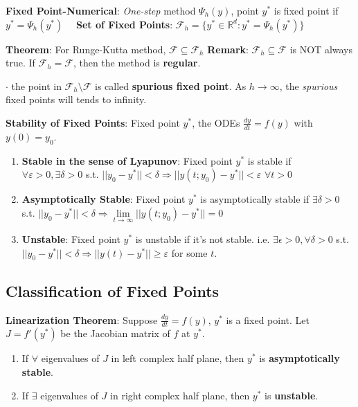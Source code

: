 \documentclass[9pt]{article}
\begin{document}
\textbf{Fixed Point-Numerical}: \textit{One-step} method $\Psi_h(y)$, point $y^*$ is fixed point if $y^*=\Psi_h(y^*)$ {\footnotesize \ \ \textbf{Set of Fixed Points}: $\mathcal{F}_h=\{y^*\in\mathbb{R}^d:y^*=\Psi_h(y^*)\}$}

\textbf{Theorem}: For Runge-Kutta method, $\mathcal{F}\subseteq\mathcal{F}_h$ \qquad \qquad \textbf{Remark}: {\small $\mathcal{F}_h\subseteq\mathcal{F}$ is NOT always true. \qquad If $\mathcal{F}_h=\mathcal{F}$, then the method is \textbf{regular}.}

$\cdot$ the point in $\mathcal{F}_h\setminus\mathcal{F}$ is called \textbf{spurious fixed point}. \qquad \qquad As $h\to\infty$, the \textit{spurious} fixed points will tends to infinity.

\textbf{Stability of Fixed Points}: Fixed point $y^*$, the ODEs $\frac{dy}{dt}=f(y)$ with $y(0)=y_0$.
\begin{enumerate}[itemsep=-2pt, topsep=-2pt]
    \item \textbf{Stable in the sense of Lyapunov}: Fixed point $y^*$ is stable if $\forall \varepsilon>0,\exists \delta>0$ s.t. $||y_0-y^*||<\delta\Rightarrow||y(t;y_0)-y^*||<\varepsilon$ $\forall t>0$
    \item \textbf{Asymptotically Stable}: Fixed point $y^*$ is asymptotically stable if $\exists \delta>0$ s.t. $||y_0-y^*||<\delta\Rightarrow\lim\limits_{t\to\infty}||y(t;y_0)-y^*||=0$
    \item \textbf{Unstable}: Fixed point $y^*$ is unstable if it's not stable. \quad i.e. $\exists \epsilon>0,\forall \delta>0$ s.t. $||y_0-y^*||<\delta\Rightarrow||y(t)-y^*||\geq\varepsilon$ for some $t$.
\end{enumerate}


\subsection{Classification of Fixed Points} %

\textbf{Linearization Theorem}: Suppose $\frac{dy}{dt}=f(y)$, $y^*$ is a fixed point. Let $J=f'(y^*)$ be the Jacobian matrix of $f$ at $y^*$.

\begin{enumerate}[itemsep=-2pt, topsep=-2pt]
    \item If $\forall$ eigenvalues of $J$ in left complex half plane, then $y^*$ is \textbf{asymptotically stable}.
    \item If $\exists$ eigenvalues of $J$ in right complex half plane, then $y^*$ is \textbf{unstable}.
\end{enumerate}
\end{document}
